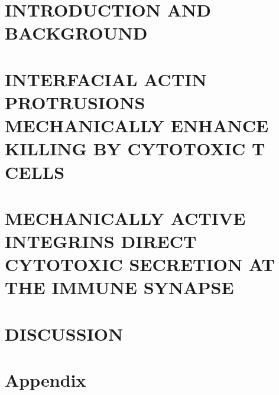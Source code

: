 \documentclass[phd,tocprelim]{cornell}
\begin{document}
\chapter{INTRODUCTION AND BACKGROUND}
\label{chap:introduction}


\chapter{INTERFACIAL ACTIN PROTRUSIONS MECHANICALLY ENHANCE KILLING BY CYTOTOXIC T CELLS }
\label{chap:chapter2}


\chapter{MECHANICALLY ACTIVE INTEGRINS DIRECT CYTOTOXIC SECRETION AT THE IMMUNE SYNAPSE}
\label{chap:chapter3}


\chapter{DISCUSSION}
\label{chap:discussion}


\appendix
\chapter{Appendix}



\end{document}
